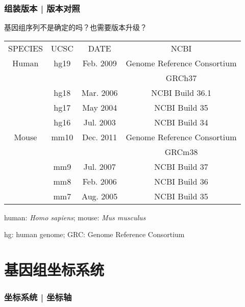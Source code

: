 \documentclass[table]{beamer}
\begin{document}
\begin{frame}
  \frametitle{组装版本 | 版本对照}
  \begin{center}
  \alert{基因组序列不是确定的吗？也需要版本升级？}
  \end{center}
  \pause
  \begin{table}
    \centering
    \begin{tabular}{cccc}
      \hline
      \rowcolor{blue!50} SPECIES & UCSC & DATE & NCBI\\
      Human & hg19 & Feb. 2009 & Genome Reference Consortium\\
       & & & GRCh37\\
       & hg18 & Mar. 2006 & NCBI Build 36.1\\
       & hg17 & May 2004 & NCBI Build 35\\
       & hg16 & Jul. 2003 & NCBI Build 34\\
      \hline
      Mouse & mm10 & Dec. 2011 & Genome Reference Consortium\\
       & & & GRCm38\\
       & mm9 & Jul. 2007 & NCBI Build 37\\
       & mm8 & Feb. 2006 & NCBI Build 36\\
       & mm7 & Aug. 2005 & NCBI Build 35\\
      \hline
    \end{tabular}
  \end{table}
  \pause
  \begin{center}
    human: \textit{Homo sapiens}; mouse: \textit{\alert{M}us \alert{m}usculus}

    hg: \alert{h}uman \alert{g}enome; GRC: \alert{G}enome \alert{R}eference \alert{C}onsortium
  \end{center}
\end{frame}

\section{基因组坐标系统}
\begin{frame}
  \frametitle{坐标系统 | 坐标轴}
  \pause
  \pause
  \pause
\end{frame}
\end{document}
